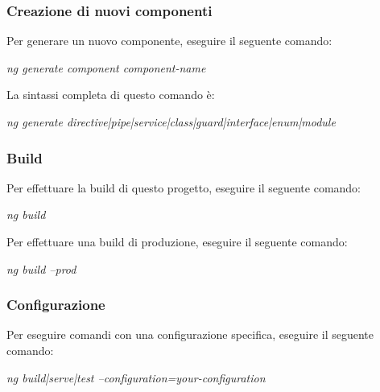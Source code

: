 \documentclass[../manuale-manutentore.tex]{subfiles}
\begin{document}
\subsubsection{Creazione di nuovi componenti}%
\label{subs:creazione_dei_nuovi_componenti}

Per generare un nuovo componente, eseguire il seguente comando: \par\bigskip

\begin{center}
  \textit{ng generate component component-name}
\end{center}
\par\bigskip

La sintassi completa di questo comando è: \par\bigskip

\begin{center}
  \textit{ng generate directive|pipe|service|class|guard|interface|enum|module}
\end{center}
\par\bigskip

\subsubsection{Build}%
\label{subs:build}

Per effettuare la build di questo progetto, eseguire il seguente comando: \par\bigskip

\begin{center}
  \textit{ng build}
\end{center}
\par\bigskip

Per effettuare una build di produzione, eseguire il seguente comando: \par\bigskip

\begin{center}
  \textit{ng build --prod}
\end{center}
\par\bigskip

\subsubsection{Configurazione}%
\label{subs:configurazione}

Per eseguire comandi con una configurazione specifica, eseguire il seguente comando: \par\bigskip

\begin{center}
  \textit{ng build|serve|test --configuration=your-configuration}
\end{center}
\par\bigskip
\end{document}
